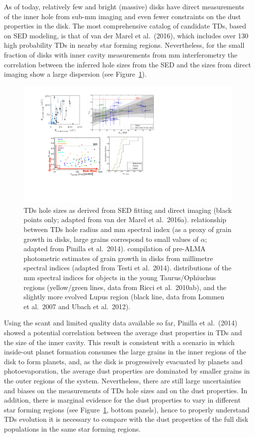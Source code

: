 \documentclass[10pt,fleqn,twoside]{article}
\begin{document}
As of today, relatively few and bright (massive) disks have direct measurements of the inner hole from sub-mm imaging
and even fewer constraints on the dust properties in the disk. The most comprehensive catalog of candidate TDs, based on SED modeling, is that of van der Marel et al.~(2016), which includes over 130 high probability TDs in nearby star forming regions. Nevertheless, for the small fraction of disks with inner cavity measurements from mm interferometry the correlation between the inferred hole sizes from the SED and the sizes from direct imaging show a large dispersion (see Figure~\ref{f_TDsiz}). 
\begin{figure}
\centerline{\includegraphics[scale=0.7]{f_dust_radii_tds.pdf}}
\caption{ TDs hole sizes as derived from SED fitting
  and direct imaging (black points only; adapted from van der Marel et
  al.~2016a).  relationship between TDs hole radius
  and mm spectral index (as a proxy of grain growth in disks, large grains
  correspond to small values of $\alpha$; adapted from Pinilla et
  al.~2014).  compilation of pre-ALMA photometric
  estimates of grain growth in disks from millimetre spectral indices
  (adapted from Testi et al.~2014). 
  distributions of the mm spectral indices for objects in the young
  Taurus/Ophiuchus regions (yellow/green lines, data from Ricci et
  al.~2010ab), and the slightly more evolved Lupus region (black line, data
  from Lommen et al.~2007 and Ubach et al.~2012).}
\label{f_TDsiz}
\end{figure}
Using the scant and limited quality data available so far, Pinilla et al.~(2014) showed a potential correlation between the average dust properties in TDs and the size of the inner cavity. This result is consistent with a scenario in which inside-out planet formation consumes the large grains in the inner regions of the disk to form planets, and, as the disk is progressively evacuated by planets and photoevaporation, the average dust properties are dominated by smaller grains in the outer regions of the
system. Nevertheless, there are still large uncertainties and biases on the measurements of TDs hole sizes and on the dust properties. In addition, there is marginal evidence for the dust properties to vary in different star forming regions (see Figure~\ref{f_TDsiz}, bottom panels), hence to properly understand TDs  evolution it is necessary to compare with the dust properties of the full disk populations in the same star forming regions.
\end{document}
